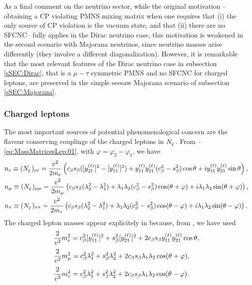 \documentclass[12pt,a4paper]{article}
\begin{document}
As a final comment on the neutrino sector, while the original motivation --obtaining a CP violating PMNS mixing matrix when one requires that (i) the only source of CP violation is the vacuum state, and that (ii) there are no SFCNC-- fully applies in the Dirac neutrino case, this motivation is weakened in the second scenario with Majorana neutrinos, since neutrino masses arise differently (they involve a different diagonalization). However, it is remarkable that the most relevant features of the Dirac neutrino case in subsection \ref{sSEC:Dirac}, that is a $\mu-\tau$ symmetric PMNS and no SFCNC for charged leptons, are preserved in the simple seesaw Majorana scenario of subsection \ref{sSEC:Majorana}.

\subsubsection{Charged leptons\label{ssSEC:ChLeptons}}
The most important sources of potential phenomenological concern are the flavour conserving couplings of the charged leptons in $\mNL$. From --\eqref{eq:MassMatricesLep:01}, with $\varphi=\varphi_2-\varphi_1$, we have
\begin{equation}\label{eq:Nl:diag:00}
 \begin{aligned}
  &n_e \equiv (\mNL)_{ee}=\frac{\vev{}^2}{2m_e}\left(\Cb\Sb([\yL{21}]^2-[\yL{11}]^2)+\yL{11}\yL{21}(\Cb^2-\Sb^2)\cos\vevPh{}+i\yL{11}\yL{21}\sin\vevPh{}\right),\\
  &n_\mu \equiv (\mNL)_{\mu\mu}=\frac{\vev{}^2}{2m_\mu}\left(\Cb\Sb(\lambda_2^2-\lambda_1^2)+\lambda_{1}\lambda_{2}(\Cb^2-\Sb^2)\cos(\vevPh{}+\varphi)+i\lambda_{1}\lambda_{2}\sin(\vevPh{}+\varphi)\right), \\
  &n_\tau \equiv (\mNL)_{\tau\tau}=\frac{\vev{}^2}{2m_\tau} \left(\Cb\Sb(\lambda_2^2-\lambda_1^2)+\lambda_{1}\lambda_{2}(\Cb^2-\Sb^2)\cos(\vevPh{}-\varphi)+i\lambda_{1}\lambda_{2}\sin(\vevPh{}-\varphi)\right).
 \end{aligned}
\end{equation}
The charged lepton masses appear explicitely in  because, from , we have used
\begin{equation}\label{eq:Ml:diag:00}
 \begin{aligned}
  & \frac{2}{v_{}^2}m_e^2=c_\beta^2[y_{11}^{\rm (\ell)}]^2+s_\beta^2[y_{21}^{\rm (\ell)}]^2+2c_\beta s_\beta y_{11}^{\rm (\ell)}y_{21}^{\rm (\ell)}\cos\theta_{},\\
  & \frac{2}{v_{}^2}m_\mu^2=c_\beta^2\lambda_{1}^2+s_\beta^2\lambda_{2}^2+2c_\beta s_\beta\lambda_{1}\lambda_{2}\cos(\theta_{}+\varphi),\\
  & \frac{2}{v_{}^2}m_\tau^2=c_\beta^2\lambda_{1}^2+s_\beta^2\lambda_{2}^2+2c_\beta s_\beta\lambda_{1}\lambda_{2}\cos(\theta_{}-\varphi).
 \end{aligned}
\end{equation}
\end{document}
